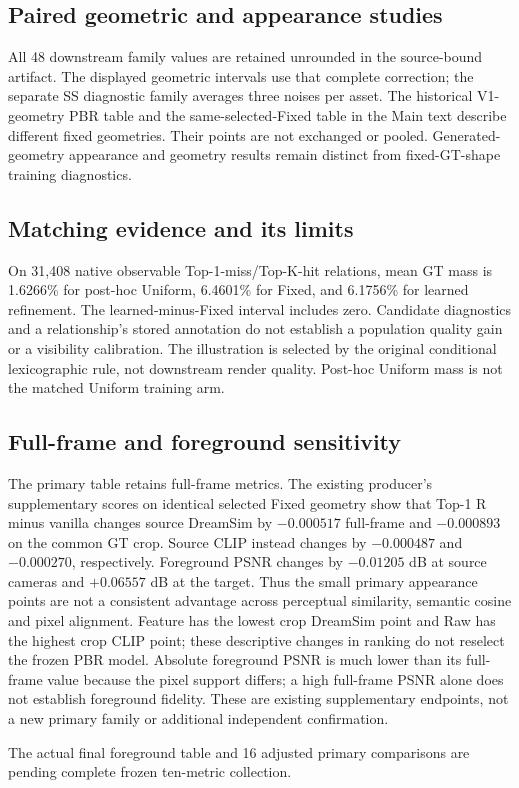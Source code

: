 \subsection{Paired geometric and appearance studies}






All 48 downstream family values are retained unrounded in the source-bound
artifact. The displayed geometric intervals use that complete correction;
the separate SS diagnostic family averages three noises per asset. The
historical V1-geometry PBR table and the same-selected-Fixed table in the Main
text describe different fixed geometries. Their points are not exchanged or
pooled. Generated-geometry appearance and geometry results remain distinct
from fixed-GT-shape training diagnostics.

\subsection{Matching evidence and its limits}


On 31,408 native observable Top-1-miss/Top-K-hit relations, mean GT mass is
1.6266\% for post-hoc Uniform, 6.4601\% for Fixed, and 6.1756\% for learned
refinement. The learned-minus-Fixed interval includes zero. Candidate
diagnostics and a relationship's stored annotation do not establish a
population quality gain or a visibility calibration. The illustration is
selected by the original conditional lexicographic rule, not downstream
render quality. Post-hoc Uniform mass is not the matched Uniform training arm.

\subsection{Full-frame and foreground sensitivity}

The primary table retains full-frame metrics. The existing producer's
supplementary scores on identical selected Fixed geometry show that Top-1 R
minus vanilla changes source DreamSim by $-0.000517$ full-frame and
$-0.000893$ on the common GT crop. Source CLIP instead changes by
$-0.000487$ and $-0.000270$, respectively. Foreground PSNR changes by
$-0.01205$ dB at source cameras and $+0.06557$ dB at the target. Thus the
small primary appearance points are not a consistent advantage across
perceptual similarity, semantic cosine and pixel alignment. Feature has the
lowest crop DreamSim point and Raw has the highest crop CLIP point; these
descriptive changes in ranking do not reselect the frozen PBR model.
Absolute foreground PSNR is much lower than its full-frame value because
the pixel support differs; a high full-frame PSNR alone does not establish
foreground fidelity. These are existing supplementary endpoints, not a new
primary family or additional independent confirmation.
\ifFinalReportReady


\else
The actual final foreground table and 16 adjusted primary comparisons are
pending complete frozen ten-metric collection.
\fi

